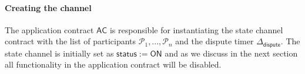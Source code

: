\documentclass{llncs}
\newcommand{\chanstatus}{\mathsf{status}}
\newcommand{\chanon}{\mathsf{ON}}
\newcommand{\chanoff}{\mathsf{OFF}}
\newcommand{\cmd}{\mathsf{cmd}}
\newcommand{\hstatei}{\mathsf{hstate}_{\monotoniccounter}}
\newcommand{\hstateplus}{\ensuremath{\mathsf{hstate}_{\monotoniccounter+1}}}
\newcommand{\monotoniccounter}{\mathsf{i}}
\newcommand{\stateinfoplus}{\mathsf{state}_{\mathsf{i+1}}}
\newcommand{\participant}{\mathcal{P}}
\newcommand{\statechannel}{\mathsf{SC}}
\newcommand{\statechanneldispute}{\mathsf{SC}.\mathsf{trigger}}
\newcommand{\statechannelsetstate}{\mathsf{SC}.\mathsf{setstatehash}}
\newcommand{\statechannelresolve}{\mathsf{SC}.\mathsf{resolve}}
\newcommand{\statechannelgetdispute}{\mathsf{SC}.\mathsf{getdispute}}
\newcommand{\statechannelclose}{\mathsf{SC}.\mathsf{close}}
\newcommand{\sign}{\mathsf{Sign}}
\newcommand{\appcontract}{\mathsf{AC}}
\newcommand{\timerdispute}{\mathsf{\Delta}_{\mathsf{dispute}}}
\newcommand{\timenow}{\mathsf{t}_{\mathsf{now}}}
\newcommand{\timedispute}{\timenow + \mathsf{\Delta}_{\mathsf{dispute}}}
\begin{document}


%
%

\paragraph{Creating the channel} 

The application contract $\appcontract$ is responsible for instantiating the state channel contract with the list of participants $\participant_{1},...,\participant_{n}$ and the dispute timer $\timerdispute$.
The state channel is initially set as $\chanstatus := \chanon$ and as we discuss in the next section all functionality in the application contract will be disabled. 
\end{document}
